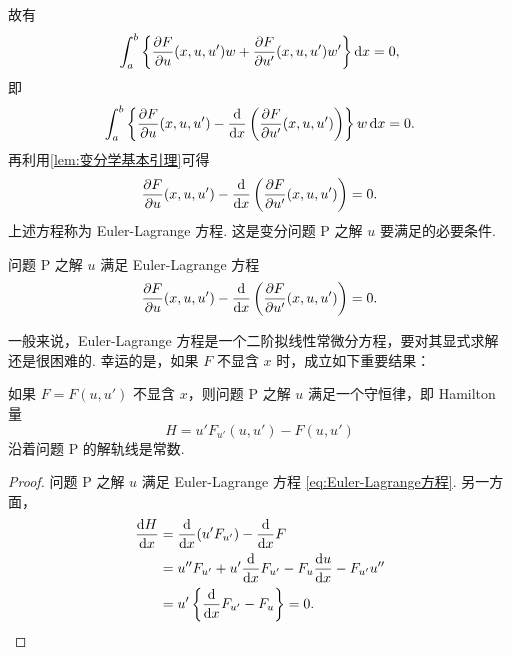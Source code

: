 故有
\begin{equation*}
    \int_a^b \left\{ \frac{\partial F}{\partial u} (x, u, u') w + \frac{\partial F}{\partial u'} (x, u, u') w' \right\} \mathop{}\!\mathrm{d} x = 0,
\end{equation*}
即
\begin{equation*}
    \int_a^b \left\{ \frac{\partial F}{\partial u} (x, u, u') - \frac{\mathop{}\!\mathrm{d} }{\mathop{}\!\mathrm{d} x} \left( \frac{\partial F}{\partial u'} (x, u, u') \right) \right\} w \mathop{}\!\mathrm{d} x = 0.
\end{equation*}
再利用\cref{lem:变分学基本引理}可得
\begin{equation}\label{eq:Euler-Lagrange方程}
    \frac{\partial F}{\partial u} (x, u, u') - \frac{\mathop{}\!\mathrm{d} }{\mathop{}\!\mathrm{d} x} \left( \frac{\partial F}{\partial u'} (x, u, u') \right) = 0.
\end{equation}
上述方程称为 Euler-Lagrange 方程. 这是变分问题 P 之解 $u$ 要满足的必要条件.

\begin{theorem}
    问题 P 之解 $u$ 满足 Euler-Lagrange 方程
    \begin{equation*}
        \frac{\partial F}{\partial u} (x, u, u') - \frac{\mathop{}\!\mathrm{d} }{\mathop{}\!\mathrm{d} x} \left( \frac{\partial F}{\partial u'} (x, u, u') \right) = 0.
    \end{equation*}    
\end{theorem}

一般来说，Euler-Lagrange 方程是一个二阶拟线性常微分方程，要对其显式求解还是很困难的. 幸运的是，如果 $F$ 不显含 $x$ 时，成立如下重要结果：

\begin{theorem}
如果 $F = F(u, u')$ 不显含 $x$，则问题 P 之解 $u$ 满足一个守恒律，即 Hamilton 量
\begin{equation}\label{eq:守恒定律}
    H = u' F_{u'} (u, u') - F(u, u')
\end{equation}
沿着问题 P 的解轨线是常数.
\end{theorem}
\begin{proof}
问题 P 之解 $u$ 满足 Euler-Lagrange 方程 \eqref{eq:Euler-Lagrange方程}. 另一方面，
\begin{align*}
    \frac{\d H}{\d x} &= \frac{\d }{\d x}(u' F_{u'}) - \frac{\d }{\d x} F \\
    &= u'' F_{u'} + u' \frac{\d }{\d x} F_{u'} - F_u \frac{\d u}{\d x} - F_{u'} u'' \\
    &= u' \left\{ \frac{\d }{\d x} F_{u'} - F_u \right\} = 0. \qedhere
\end{align*}
\end{proof}


